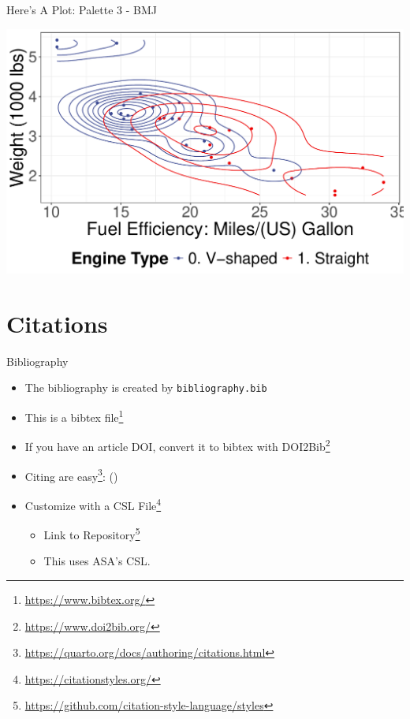 \documentclass[
  11pt,
  ignorenonframetext,
]{beamer}
\providecommand{\tightlist}{%
  \setlength{\itemsep}{0pt}\setlength{\parskip}{0pt}}
\DeclareRobustCommand{\href}[2]{#2\footnote{\url{#1}}}
\begin{document}
\begin{frame}{Here's A Plot: Palette 3 - BMJ}
\label{heres-a-plot-palette-3---bmj-1}
\begin{center}
\includegraphics[width=\linewidth,height=0.8\textheight,keepaspectratio]{figures/mtcars-density-mpg-vs-wt-by-vs-palette-4-1.pdf}
\end{center}
\end{frame}

\section{Citations}\label{citations}

\begin{frame}[fragile]{Bibliography}
\label{bibliography}
\begin{itemize}
\tightlist
\item
  The bibliography is created by \texttt{bibliography.bib}
\item
  This is a \href{https://www.bibtex.org/}{bibtex file}
\item
  If you have an article DOI, convert it to bibtex with
  \href{https://www.doi2bib.org/}{DOI2Bib}
\item
  \href{https://quarto.org/docs/authoring/citations.html}{Citing are
  easy}: ()
\item
  Customize with a \href{https://citationstyles.org/}{CSL File}

  \begin{itemize}
  \tightlist
  \item
    \href{https://github.com/citation-style-language/styles}{Link to
    Repository}
  \item
    This uses ASA's CSL.
  \end{itemize}
\end{itemize}
\end{frame}
\end{document}
